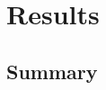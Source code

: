 
\chapter{Results}
\label{chap:fifth
}
\ifpdf
    \graphicspath{{Chapter8/Figures/PNG/}{Chapter8/Figures/PDF/}{Chapter8/Figures/}}
\else
    \graphicspath{{Chapter6/Figures/EPS/}{Chapter8/Figures/}}
\fi

\section*{Summary}